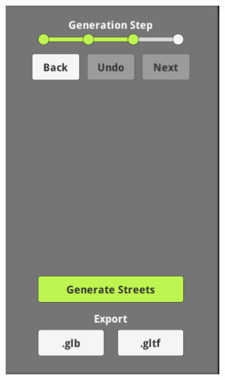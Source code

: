 \begin{figure}[H]
\begin{subfigure}[b]{0.24\textwidth}
    \includegraphics[width=\textwidth]{figure/results/gui3.png}
  \end{subfigure}
  \begin{subfigure}[b]{0.24\textwidth}

\end{subfigure}
\end{figure}
